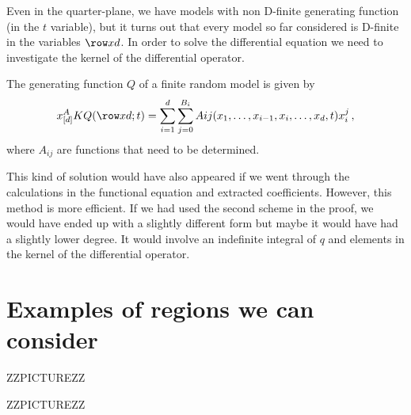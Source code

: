 Even in the quarter-plane, we have models with non D-finite generating function (in the $t$ variable), but it turns out that every model so far considered is D-finite in the variables $\row xd$. In order to solve the differential equation we need to investigate the kernel of the differential operator.
\begin{corollary}
The generating function $Q$ of a finite random model is given by
\begin{align}
	x_{[d]}^{A}KQ(\row xd;t) = \sum_{i=1}^d \sum_{j=0}^{B_i}Aij(x_1,\ldots,x_{i-1},x_i,\ldots, x_d,t) x_i^j\,,
\end{align}
where $A_{ij}$ are functions that need to be determined.
\end{corollary}
This kind of solution would have also appeared if we went through the calculations in the functional equation and extracted coefficients. However, this method is more efficient. If we had used the second scheme in the proof, we would have ended up with a slightly different form but maybe it would have had a slightly lower degree. It would involve an indefinite integral of $q$ and elements in the kernel of the differential operator.


\section{Examples of regions we can consider}

ZZPICTUREZZ

ZZPICTUREZZ

